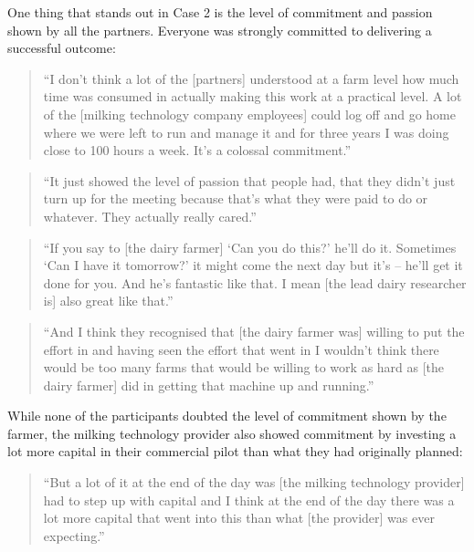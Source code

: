 One thing that stands out in Case 2 is the level of commitment and passion shown by all the partners. Everyone was strongly committed to delivering a successful outcome:

\begin{quote}
\small
\enquote{I don't think a lot of the [partners] understood at a farm level how much time was consumed in actually making this work at a practical level. A lot of the [milking technology company employees] could log off and go home where we were left to run and manage it and for three years I was doing close to 100 hours a week. It's a colossal commitment.} \\
\end{quote}

\begin{quote}
\small
\enquote{It just showed the level of passion that people had, that they didn't just turn up for the meeting because that's what they were paid to do or whatever. They actually really cared.} \\
\end{quote}

\begin{quote}
\small
\enquote{If you say to [the dairy farmer] \enquote{Can you do this?} he'll do it. Sometimes \enquote{Can I have it tomorrow?} it might come the next day but it's – he'll get it done for you. And he’s fantastic like that.  I mean [the lead dairy researcher is] also great like that.} \\
\end{quote}

\begin{quote}
\small
\enquote{And I think they recognised that [the dairy farmer was] willing to put the effort in and having seen the effort that went in I wouldn't think there would be too many farms that would be willing to work as hard as [the dairy farmer] did in getting that machine up and running.} \\
\end{quote}

While none of the participants doubted the level of commitment shown by the farmer, the milking technology provider also showed commitment by investing a lot more capital in their commercial pilot than what they had originally planned:

\begin{quote}
\small
\enquote{But a lot of it at the end of the day was [the milking technology provider] had to step up with capital and I think at the end of the day there was a lot more capital that went into this than what [the provider] was ever expecting.} \\
\end{quote}

